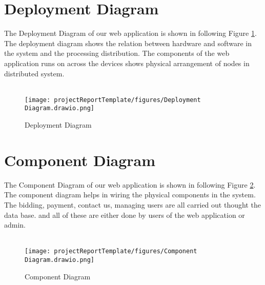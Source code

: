\section{Deployment Diagram}
The Deployment Diagram of our web application is shown in following Figure \ref{DD}. The deployment diagram shows the relation between hardware and software in the system and the processing distribution. The components of the web application runs on across the devices shows physical arrangement of nodes in distributed system.  \\\\

\begin{figure}[!h]
    \centering
    \texttt{[image: projectReportTemplate/figures/Deployment Diagram.drawio.png]}
    \caption{Deployment Diagram}
    \label{DD}
\end{figure}
\newpage
\section{Component Diagram}
The Component Diagram of our web application is shown in following Figure \ref{CD}. The component diagram helps in wiring the physical components in the system. The bidding, payment, contact us, managing users are all carried out thought the data base. and all of these are either done by users of the web application or admin.\\\\

\begin{figure}[!h]
    \centering
    \texttt{[image: projectReportTemplate/figures/Component Diagram.drawio.png]}
    \caption{Component Diagram}
    \label{CD}
\end{figure}
